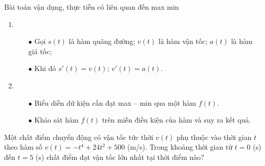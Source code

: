 
\begin{dang}{Bài toán vận dụng, thực tiễn có liên quan đến max min}
	\begin{enumerate}[\iconMT]
		\item {}
		\begin{itemize}
			\item [$\bullet$] Gọi $s(t)$ là hàm quãng đường; $v(t)$ là hàm vận tốc; $a(t)$ là hàm giá tốc;
			\item [$\bullet$] Khi đó $s'(t)=v(t)$; $v'(t)=a(t)$.
		\end{itemize}
		\item {}
		\begin{itemize}
			\item[$\bullet$] Biểu diễn dữ kiện cần đạt max -- min qua một hàm $f(t)$. 
			\item[$\bullet$] Khảo sát hàm $f(t)$ trên miền điều kiện của hàm và suy ra kết quả.
		\end{itemize}
	\end{enumerate}
\end{dang}
\begin{vd}%
	Một chất điểm chuyển động có vận tốc tức thời $v(t)$ phụ thuộc vào thời gian $t$ theo hàm số $v(t)=-t^4+24t^2+500$ (m/s). Trong khoảng thời gian từ $t=0$ (s) đến $t=5$ (s) chất điểm đạt vận tốc lớn nhất tại thời điểm nào?
\end{vd}
